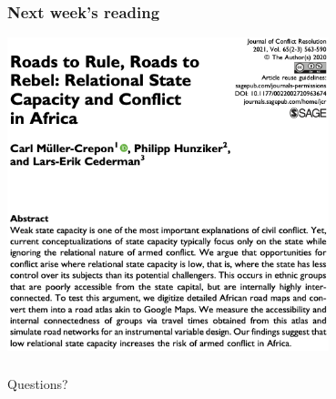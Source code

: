 \documentclass[aspectratio=43]{beamer}
\begin{document}
\begin{frame}
\frametitle{Next week's reading}
\centering

\includegraphics[width = 0.7\textwidth]{../img/mullercrepon}

\end{frame}

\begin{frame}
\frametitle{}
\centering

Questions?

\end{frame}


\end{document}
